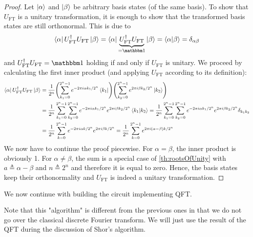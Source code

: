 		\begin{proof}
			Let \( \ket{\alpha} \) and \( \ket{\beta} \) be arbitrary basis states (of the same basis). To show that \(U_\mathrm{FT}\) is a unitary transformation, it is enough to show that the transformed basis states are still orthonormal. This is due to
			\begin{equation}
				\bra{\alpha} U_\mathrm{FT}^\dagger U_\mathrm{FT} \ket{\beta}
					= \bra{\alpha} \underbrace{U_\mathrm{FT}^\dagger U_\mathrm{FT}}_{= \ID} \ket{\beta}
					= \bra{\alpha} \ket{\beta}
					= \delta_{\alpha \beta}
			\end{equation}
			and \( U_\mathrm{FT}^\dagger U_\mathrm{FT} = \ID \) holding if and only if \(U_\mathrm{FT}\) is unitary. We proceed by calculating the first inner product (and applying \(U_\mathrm{FT}\) according to its definition):
			\begin{align}
				\bra{\alpha} U_\mathrm{FT}^\dagger U_\mathrm{FT} \ket{\beta}
					&= \frac{1}{2^n} \Biggl( \sum_{k_1 = 0}^{2^n - 1} e^{-2 \pi i \alpha k_1 / 2^n} \bra{k_1} \Biggr) \Biggl( \sum_{k_2 = 0}^{2^n - 1} e^{2 \pi i \beta k_2 / 2^n} \ket{k_2} \Biggr) \\
					&= \frac{1}{2^n} \sum_{k_1 = 0}^{2^n - 1} \sum_{k_2 = 0}^{2^n - 1} e^{-2 \pi i \alpha k_1 / 2^n} e^{2 \pi i \beta k_2 / 2^n} \ip{k_1}{k_2}
					 = \frac{1}{2^n} \sum_{k_1 = 0}^{2^n - 1} \sum_{k_2 = 0}^{2^n - 1} e^{-2 \pi i \alpha k_1 / 2^n} e^{2 \pi i \beta k_2 / 2^n} \delta_{k_1 k_2} \\
					&= \frac{1}{2^n} \sum_{k = 0}^{2^n - 1} e^{-2 \pi i \alpha k / 2^n} e^{2 \pi i \beta k / 2^n}
					 = \frac{1}{2^n} \sum_{k = 0}^{2^n - 1} e^{2 \pi i (\alpha - \beta) k / 2^n}
			\end{align}
			We now have to continue the proof piecewise. For \(\alpha = \beta\), the inner product is obviously \num{1}. For \(\alpha \neq \beta\), the sum is a special case of \autoref{th:rootsOfUnity} with \( a \triangleq \alpha - \beta \) and \( n \triangleq 2^n \) and therefore it is equal to zero. Hence, the basis states keep their orthonormality and \(U_\mathrm{FT}\) is indeed a unitary transformation.
		\end{proof}
		We now continue with building the circuit implementing \ac{QFT}.

		Note that this "algorithm" is different from the previous ones in that we do not go over the classical discrete Fourier transform. We will just use the result of the \ac{QFT} during the discussion of Shor's algorithm.

